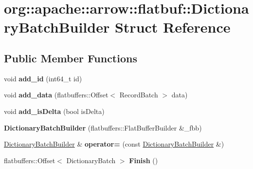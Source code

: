 \hypertarget{structorg_1_1apache_1_1arrow_1_1flatbuf_1_1DictionaryBatchBuilder}{}\section{org\+:\+:apache\+:\+:arrow\+:\+:flatbuf\+:\+:Dictionary\+Batch\+Builder Struct Reference}
\label{structorg_1_1apache_1_1arrow_1_1flatbuf_1_1DictionaryBatchBuilder}
\subsection*{Public Member Functions}
\begin{DoxyCompactItemize}
\item 
void {\bfseries add\+\_\+id} (int64\+\_\+t id)\hypertarget{structorg_1_1apache_1_1arrow_1_1flatbuf_1_1DictionaryBatchBuilder_a5edc5812c7c8778b31d41af500da4fa1}{}\label{structorg_1_1apache_1_1arrow_1_1flatbuf_1_1DictionaryBatchBuilder_a5edc5812c7c8778b31d41af500da4fa1}

\item 
void {\bfseries add\+\_\+data} (flatbuffers\+::\+Offset$<$ Record\+Batch $>$ data)\hypertarget{structorg_1_1apache_1_1arrow_1_1flatbuf_1_1DictionaryBatchBuilder_a0d5f24f8ba40ebeb609a092dd03e1b7c}{}\label{structorg_1_1apache_1_1arrow_1_1flatbuf_1_1DictionaryBatchBuilder_a0d5f24f8ba40ebeb609a092dd03e1b7c}

\item 
void {\bfseries add\+\_\+is\+Delta} (bool is\+Delta)\hypertarget{structorg_1_1apache_1_1arrow_1_1flatbuf_1_1DictionaryBatchBuilder_a235262a913fc75110e1cfb63936930a2}{}\label{structorg_1_1apache_1_1arrow_1_1flatbuf_1_1DictionaryBatchBuilder_a235262a913fc75110e1cfb63936930a2}

\item 
{\bfseries Dictionary\+Batch\+Builder} (flatbuffers\+::\+Flat\+Buffer\+Builder \&\+\_\+fbb)\hypertarget{structorg_1_1apache_1_1arrow_1_1flatbuf_1_1DictionaryBatchBuilder_a6f3fb893c64704e210d181ed7433ac4f}{}\label{structorg_1_1apache_1_1arrow_1_1flatbuf_1_1DictionaryBatchBuilder_a6f3fb893c64704e210d181ed7433ac4f}

\item 
\hyperlink{structorg_1_1apache_1_1arrow_1_1flatbuf_1_1DictionaryBatchBuilder}{Dictionary\+Batch\+Builder} \& {\bfseries operator=} (const \hyperlink{structorg_1_1apache_1_1arrow_1_1flatbuf_1_1DictionaryBatchBuilder}{Dictionary\+Batch\+Builder} \&)\hypertarget{structorg_1_1apache_1_1arrow_1_1flatbuf_1_1DictionaryBatchBuilder_a0ba10b0e8a0aa76153863ecd8f705936}{}\label{structorg_1_1apache_1_1arrow_1_1flatbuf_1_1DictionaryBatchBuilder_a0ba10b0e8a0aa76153863ecd8f705936}

\item 
flatbuffers\+::\+Offset$<$ Dictionary\+Batch $>$ {\bfseries Finish} ()\hypertarget{structorg_1_1apache_1_1arrow_1_1flatbuf_1_1DictionaryBatchBuilder_a76a780f12ca9ba1c5c6ec0c9df7abaed}{}\label{structorg_1_1apache_1_1arrow_1_1flatbuf_1_1DictionaryBatchBuilder_a76a780f12ca9ba1c5c6ec0c9df7abaed}

\end{DoxyCompactItemize}
